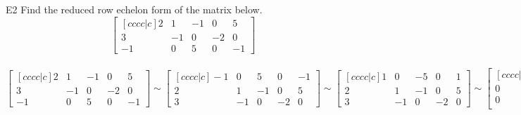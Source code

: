 \begin{problem}{E2}
Find the reduced row echelon form of the matrix below.
$$\begin{bmatrix}[cccc|c] 2 & 1 & -1 & 0 & 5 \\ 3 & -1 & 0 & -2 & 0 \\ -1 & 0 & 5 & 0 & -1 \end{bmatrix}$$
\end{problem}
\begin{solution}
$$\begin{bmatrix}[cccc|c]
 2 & 1 & -1 & 0 & 5 \\
 3 & -1 & 0 & -2 & 0 \\
 -1 & 0 & 5 & 0 & -1 
\end{bmatrix} \sim
\begin{bmatrix}[cccc|c]
 -1 & 0 & 5 & 0 & -1  \\
 2 & 1 & -1 & 0 & 5 \\
 3 & -1 & 0 & -2 & 0 
\end{bmatrix} \sim
\begin{bmatrix}[cccc|c]
 1 & 0 & -5 & 0 & 1 \\
 2 & 1 & -1 & 0 & 5 \\
 3 & -1 & 0 & -2 & 0 
\end{bmatrix} \sim
\begin{bmatrix}[cccc|c]
 1 & 0 & -5 & 0 & 1  \\
 0 & 1 & 9 & 0 & 3 \\
 0 & -1 & 15 & -2 & -3 \\
\end{bmatrix} \sim
\begin{bmatrix}[cccc|c]
 1 & 0 & -5 & 0 & 1  \\
 0 & 1 & 9 & 0 & 3 \\
 0 & 0 & 24 & -2 & 0 \\
\end{bmatrix} \sim
\begin{bmatrix}[cccc|c]
 1 & 0 & -5 & 0 & 1 \\
 0 & 1 & 9 & 0 & 3 \\
 0 & 0 & 1 & -\frac{1}{12} & 0 \\
\end{bmatrix} \sim
\begin{bmatrix}[cccc|c] 
1 & 0 & 0 & -\frac{5}{12} & 1 \\
 0 & 1 & 0 & \frac{3}{4} & 3 \\ 
 0 & 0 & 1 & -\frac{1}{12} & 0 
\end{bmatrix}$$
\end{solution}
